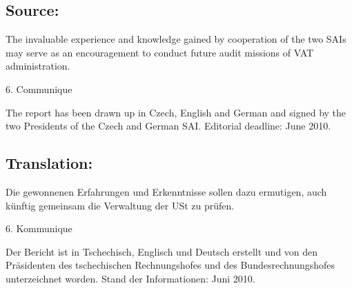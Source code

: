 \documentclass[10pt]{article}
\begin{document}
\subsection*{Source:}

The invaluable experience and knowledge gained by cooperation of the two SAIs may serve as an encouragement to conduct future audit missions of VAT administration.


6. Communique

The report has been drawn up in Czech, English and German and signed by the two Presidents of the Czech and German SAI.
Editorial deadline: June 2010.


\pagebreak

\subsection*{Translation:}

Die gewonnenen Erfahrungen und Erkenntnisse sollen dazu ermutigen, auch künftig gemeinsam die Verwaltung der USt zu prüfen.


6. Kommunique

Der Bericht ist in Tschechisch, Englisch und Deutsch erstellt und von den Präsidenten des tschechischen Rechnungshofes und des Bundesrechnungshofes unterzeichnet worden.
Stand der Informationen: Juni 2010.
\end{document}
